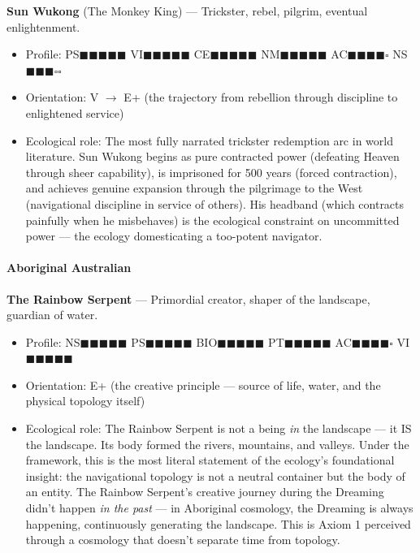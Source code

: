 \textbf{Sun Wukong} (The Monkey King) — Trickster, rebel, pilgrim, eventual enlightenment.

\begin{itemize}[nosep,leftmargin=*]
  \item Profile: PS$\blacksquare$$\blacksquare$$\blacksquare$$\blacksquare$$\blacksquare$ VI$\blacksquare$$\blacksquare$$\blacksquare$$\blacksquare$$\blacksquare$ CE$\blacksquare$$\blacksquare$$\blacksquare$$\blacksquare$$\blacksquare$ NM$\blacksquare$$\blacksquare$$\blacksquare$$\blacksquare$$\blacksquare$ AC$\blacksquare$$\blacksquare$$\blacksquare$$\blacksquare$$\square$ NS$\blacksquare$$\blacksquare$$\blacksquare$$\square$$\square$
  \item Orientation: V $\rightarrow$ E+ (the trajectory from rebellion through discipline to enlightened service)
  \item Ecological role: The most fully narrated trickster redemption arc in world literature. Sun Wukong begins as pure contracted power (defeating Heaven through sheer capability), is imprisoned for 500 years (forced contraction), and achieves genuine expansion through the pilgrimage to the West (navigational discipline in service of others). His headband (which contracts painfully when he misbehaves) is the ecological constraint on uncommitted power — the ecology domesticating a too-potent navigator.
\end{itemize}


\paragraph*{Aboriginal Australian}


\textbf{The Rainbow Serpent} — Primordial creator, shaper of the landscape, guardian of water.

\begin{itemize}[nosep,leftmargin=*]
  \item Profile: NS$\blacksquare$$\blacksquare$$\blacksquare$$\blacksquare$$\blacksquare$ PS$\blacksquare$$\blacksquare$$\blacksquare$$\blacksquare$$\blacksquare$ BIO$\blacksquare$$\blacksquare$$\blacksquare$$\blacksquare$$\blacksquare$ PT$\blacksquare$$\blacksquare$$\blacksquare$$\blacksquare$$\blacksquare$ AC$\blacksquare$$\blacksquare$$\blacksquare$$\blacksquare$$\square$ VI$\blacksquare$$\blacksquare$$\blacksquare$$\blacksquare$$\blacksquare$
  \item Orientation: E+ (the creative principle — source of life, water, and the physical topology itself)
  \item Ecological role: The Rainbow Serpent is not a being \textit{in} the landscape — it IS the landscape. Its body formed the rivers, mountains, and valleys. Under the framework, this is the most literal statement of the ecology's foundational insight: the navigational topology is not a neutral container but the body of an entity. The Rainbow Serpent's creative journey during the Dreaming didn't happen \textit{in the past} — in Aboriginal cosmology, the Dreaming is always happening, continuously generating the landscape. This is Axiom 1 perceived through a cosmology that doesn't separate time from topology.
\end{itemize}


